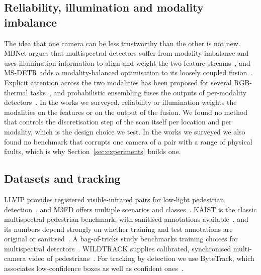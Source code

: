 \subsection{Reliability, illumination and modality imbalance}
The idea that one camera can be less trustworthy than the other is not new. MBNet argues that multispectral detectors suffer from modality imbalance and uses illumination information to align and weight the two feature streams~\cite{zhou2020mbnet}, and MS-DETR adds a modality-balanced optimisation to its loosely coupled fusion~\cite{xing2024msdetr}. Explicit attention across the two modalities has been proposed for several RGB-thermal tasks~\cite{liang2023eaefnet}, and probabilistic ensembling fuses the outputs of per-modality detectors~\cite{chen2022proben}. In the works we surveyed, reliability or illumination weights the modalities on the features or on the output of the fusion. We found no method that controls the discretisation step of the scan itself per location and per modality, which is the design choice we test. In the works we surveyed we also found no benchmark that corrupts one camera of a pair with a range of physical faults, which is why Section~\ref{sec:experiments} builds one.

\subsection{Datasets and tracking}
LLVIP provides registered visible-infrared pairs for low-light pedestrian detection~\cite{jia2021llvip}, and M3FD offers multiple scenarios and classes~\cite{liu2022tardal}. KAIST is the classic multispectral pedestrian benchmark, with sanitised annotations available~\cite{li2018kaistsanitized}, and its numbers depend strongly on whether training and test annotations are original or sanitised~\cite{zhang2021gaff}. A bag-of-tricks study benchmarks training choices for multispectral detectors~\cite{zhou2024tricks}. WILDTRACK supplies calibrated, synchronised multi-camera video of pedestrians~\cite{chavdarova2018wildtrack}. For tracking by detection we use ByteTrack, which associates low-confidence boxes as well as confident ones~\cite{zhang2022bytetrack}.
